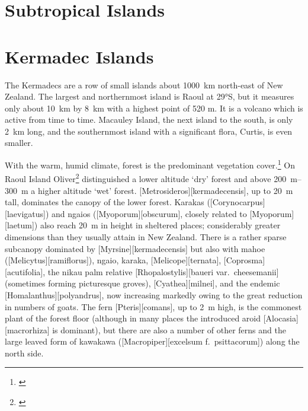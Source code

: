 \section{Subtropical Islands}

\section{Kermadec Islands}

The Kermadecs are a row of small islands about \SI{1000}{\kilo\metre} north-east of New Zealand.
The largest and northernmost island is Raoul at \ang{29}S, but it measures only about \SI{10}{\kilo\metre} by \SI{8}{\kilo\metre} with a highest point of 520 m.
It is a volcano which is active from time to time.
Macauley Island, the next island to the south, is only \SI{2}{\kilo\metre} long, and the southernmost island with a significant flora, Curtis, is even smaller.

With the warm, humid climate, forest is the predominant vegetation cover.\footnote{\cite{sykes1977annotated}}
On Raoul Island Oliver\footnote{\cite{oliver1910vegetation}} distinguished a lower altitude `dry' forest and above \SIrange{200}{300}{\metre} a higher altitude `wet' forest. [Metrosideros][kermadecensis], up to \SI{20}{\metre} tall, dominates the canopy of the lower forest.
Karakas ([Corynocarpus][laevigatus]) and ngaios ([Myoporum][obscurum], closely related to [Myoporum][laetum]) also reach \SI{20}{\metre} in height in sheltered places; considerably greater dimensions than they usually attain in New Zealand.
There is a rather sparse subcanopy dominated by [Myrsine][kermadecensis] but also with mahoe ([Melicytus][ramiflorus]), ngaio, karaka, [Melicope][ternata], [Coprosma][acutifolia], the nikau palm relative [Rhopalostylis][baueri var.\ cheesemanii] (sometimes forming picturesque groves), [Cyathea][milnei], and the endemic [Homalanthus][polyandrus], now increasing markedly owing to the great reduction in numbers of goats.
The fern [Pteris][comans], up to \SI{2}{\metre} high, is the commonest plant of the forest floor (although in many places the introduced aroid [Alocasia][macrorhiza] is dominant), but there are also a number of other ferns and the large leaved form of kawakawa ([Macropiper][excelsum f.\ psittacorum]) along the north side.

